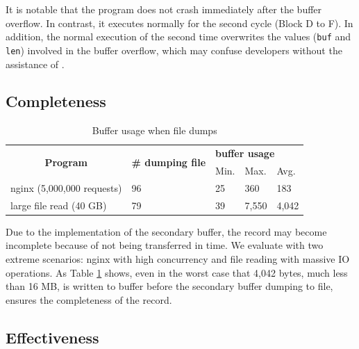 It is notable that the program does not crash immediately after the buffer 
overflow. In contrast, it executes normally for the second cycle (Block D to F). 
In addition, the normal execution of the second time overwrites the 
values (\texttt{buf} and \texttt{len}) involved in the buffer overflow, which 
may confuse developers without the assistance of \TheName.


\subsection{Completeness} \label{subsec:eva-flowaccuracy}

\begin{table}
    \caption{Buffer usage when file dumps}
    \centering
        \begin{tabular}{@{}lllll@{}}
            \toprule
            \multicolumn{1}{c}{\multirow{2}{*}{\textbf{Program}}} & \multirow{2}{*}{\textbf{\# dumping file}} & \multicolumn{3}{l}{\textbf{buffer usage}} \\
            \multicolumn{1}{c}{}                                  &                                           & Min.                & Max.               & Avg.               \\ \midrule
            nginx (5,000,000 requests)                                                  & 96                                        & 25                  & 360                & 183                \\
            large file read (40 GB)                                      & 79                                        & 39                  & 7,550               & 4,042               \\ \bottomrule
            \end{tabular}
    \label{table:Completeness}
\end{table}

Due to the implementation of the secondary buffer, the record may become incomplete because of not being transferred in time. We evaluate \TheName with two extreme scenarios: nginx with high concurrency and file reading with massive IO operations. As Table \ref{table:Completeness} shows,
 even in the worst case that 4,042 bytes, much less than 16 MB, is written to buffer before the secondary buffer dumping to file, \TheName ensures the completeness of the record.

\subsection{Effectiveness} \label{subsec:eva-Effectiveness}

